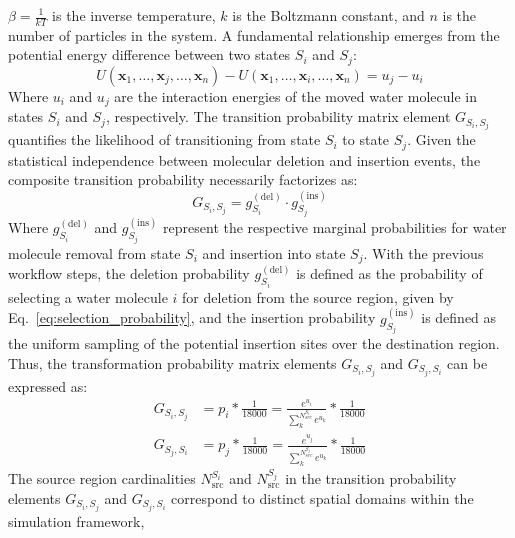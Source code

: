 \documentclass[journal=jacsat,manuscript=article]{achemso}
\begin{document}
$\beta = \frac{1}{kT}$ is the inverse temperature, $k$ is the Boltzmann constant, and $n$ is the number of particles in the system.
A fundamental relationship emerges from the potential energy difference between two states $S_i$ and $S_j$:
\begin{equation}\label{eq:potential_energy_interaction}
U\left(\mathbf{x}_1, \ldots, \mathbf{x}_j,\ldots, \mathbf{x}_n\right) - U\left(\mathbf{x}_1, \ldots, \mathbf{x}_i,\ldots, \mathbf{x}_n\right) = u_j - u_i
\end{equation}
Where $u_i$ and $u_j$ are the interaction energies of the moved water molecule in states $S_i$ and $S_j$, respectively.
\newline
The transition probability matrix element $G_{S_i, S_j}$ quantifies the likelihood of transitioning from state $S_i$ to state $S_j$. 
Given the statistical independence between molecular deletion and insertion events, 
the composite transition probability necessarily factorizes as:
\begin{equation}\label{eq:transition_probability_decomposition}
G_{S_i, S_j} = g_{S_i}^{(\text{del})} \cdot g_{S_j}^{(\text{ins})}
\end{equation}
Where $g_{S_i}^{(\text{del})}$ and $g_{S_j}^{(\text{ins})}$ represent the respective marginal probabilities for water molecule removal from state $S_i$ and insertion into state $S_j$.
With the previous workflow steps, the deletion probability $g_{S_i}^{(\text{del})}$ is defined as the probability of selecting a water molecule $i$ for deletion from the source region, 
given by Eq.~\ref{eq:selection_probability}, 
and the insertion probability $g_{S_j}^{(\text{ins})}$ is defined as the uniform sampling of the potential insertion sites over the destination region.
Thus, the transformation probability matrix elements $G_{S_i, S_j}$ and $G_{S_j, S_i}$ can be expressed as:
\begin{equation}\label{eq:transition_probability}
  \begin{aligned}
G_{S_i, S_j} &= p_i * \frac{1}{18000} = \frac{e^{u_i}}{\sum^{N^{S_i}_{src}}_k{e^{u_k}}} * \frac{1}{18000} \\
G_{S_j, S_i} &= p_j * \frac{1}{18000} = \frac{e^{u_j}}{\sum^{N^{S_j}_{src}}_k{e^{u_k}}} * \frac{1}{18000}  
  \end{aligned}
\end{equation}
The source region cardinalities $N_{\text{src}}^{S_i}$ and $N_{\text{src}}^{S_j}$ in the transition probability elements $G_{S_i, S_j}$ and $G_{S_j, S_i}$ correspond to distinct spatial domains within the simulation framework, 
\end{document}
